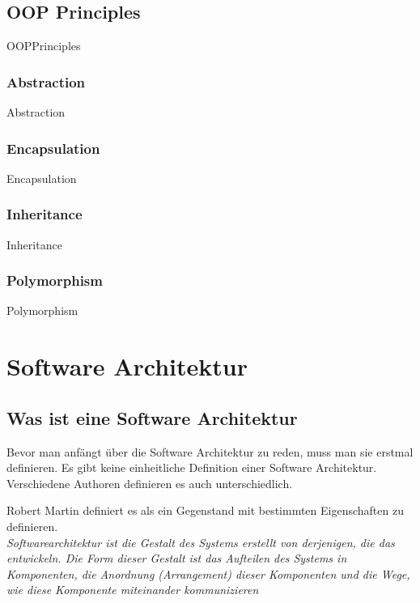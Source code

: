\documentclass{article}
\begin{document}
    \subsection{OOP Principles}
        {OOPPrinciples}

        \subsubsection{Abstraction}
            {Abstraction}

        \subsubsection{Encapsulation}
            {Encapsulation}

        \subsubsection{Inheritance}
            {Inheritance}

        \subsubsection{Polymorphism}
            {Polymorphism}

\newpage

\section{Software Architektur}
    \subsection{Was ist eine Software Architektur}

    Bevor man anfängt über die Software Architektur zu reden, muss man sie erstmal definieren.
    Es gibt keine einheitliche Definition einer Software Architektur. Verschiedene Authoren definieren es auch unterschiedlich.

    Robert Martin definiert es als ein Gegenstand mit bestimmten Eigenschaften zu definieren.\\
    \textit{Softwarearchitektur ist die Gestalt des Systems erstellt von derjenigen, die das entwickeln. 
    Die Form dieser Gestalt ist das Aufteilen des Systems in Komponenten, die Anordnung (Arrangement) dieser Komponenten und die Wege, 
    wie diese Komponente miteinander kommunizieren} \cite[136]{cleanArchitecture}
    
\end{document}
